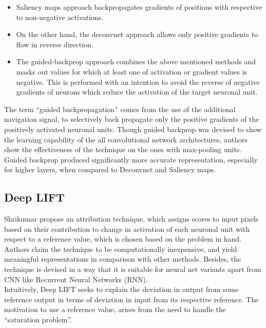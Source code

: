 \documentclass[../report.tex]{subfiles}
\begin{document}
 \begin{itemize}
 	\item Saliency maps approach backpropagates gradients of positions with respective to non-negative activations.
 	\item On the other hand, the deconvnet approach allows only positive gradients to flow in reverse direction.
 	\item The guided-backprop approach combines the above mentioned methods and masks out values for which at least  one of activation or gradient values is negative. This is performed with an intention to avoid the reverse of negative gradients of neurons which reduce the activation of the target neuronal unit.
 \end{itemize}

The term \enquote{guided backpropagation} comes from the use of the additional navigation signal, to selectively back propagate only the positive gradients of the positively activated neuronal units. Though guided backprop was devised to show the learning capability of the all convolutional network architectures, authors show the effectiveness of the technique on the ones with max-pooling units. Guided backprop produced significantly more accurate representation, especially  for higher layers, when compared to Deconvnet and Saliency maps.

\subsection{Deep LIFT}
 Shrikumar \etal \cite{shrikumar2017learning} propose an attribution technique, which assigns scores to input pixels based on their contribution to change in activation of each neuronal unit with respect to a reference value, which is chosen based on the problem in hand. Authors claim the technique to be computationally inexpensive, and yield meaningful representations in comparison with other methods. Besides, the technique is devised in a way that it is suitable for neural net variants apart from CNN like Recurrent Neural Networks (RNN).\\
 Intuitively, Deep LIFT seeks to explain the deviation in output from some reference output in terms of deviation in input from its respective reference. The motivation to use a reference value, arises from the need to handle the \enquote{saturation problem}.
  
\end{document}
